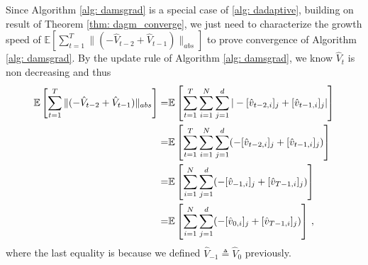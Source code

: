 \documentclass{article} %
\begin{document}
Since Algorithm \ref{alg: damsgrad} is a special case of \ref{alg: dadaptive}, building on result of Theorem \ref{thm: dagm_converge}, we just need to characterize the growth speed of $\mathbb E \left[ \sum_{t=1}^{T}   \|    (- \hat V_{t-2} + \hat V_{t-1} ) \|_{abs} \right]  $ to prove convergence of Algorithm \ref{alg: damsgrad}.  By the update rule of Algorithm \ref{alg: damsgrad}, we know $\hat V_t$ is non decreasing and thus 
\begin{align}\notag
\begin{split}
\mathbb E \left[ \sum_{t=1}^{T}   \|    (- \hat V_{t-2} + \hat V_{t-1} ) \|_{abs} \right] = &\mathbb E \left[ \sum_{t=1}^{T}  \sum_{i=1}^N \sum_{j=1}^d    |- [\hat v_{t-2,i}]_j + [\hat v_{t-1,i}]_j | \right]    \\
= &\mathbb E \left[ \sum_{t=1}^{T}  \sum_{i=1}^N \sum_{j=1}^d    (- [\hat v_{t-2,i}]_j + [\hat v_{t-1,i}]_j ) \right]    \\
= &\mathbb E \left[   \sum_{i=1}^N \sum_{j=1}^d    (- [\hat v_{-1,i}]_j + [\hat v_{T-1,i}]_j ) \right]    \\
= &\mathbb E \left[   \sum_{i=1}^N \sum_{j=1}^d    (- [\hat v_{0,i}]_j + [\hat v_{T-1,i}]_j ) \right] \, ,  \\
\end{split}
\end{align}
where the last equality is because  we defined $\hat V_{-1} \triangleq \hat V_0$  previously.
\end{document}
